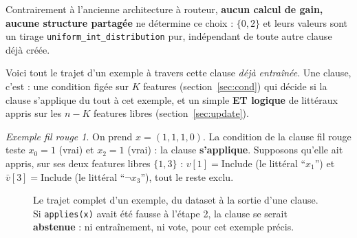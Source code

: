 \documentclass[12pt,a4paper]{article}
\newcommand{\Inc}{\ensuremath{\mathrm{Include}}}
\newcommand{\vbar}{\bar{v}}
\newcommand{\code}[1]{\texttt{#1}}
\theoremstyle{remark}
\newtheorem{exemple}{Exemple fil rouge}[section]
\begin{document}
\noindent Contrairement à l'ancienne architecture à routeur, \textbf{aucun
calcul de gain, aucune structure partagée} ne détermine ce choix : $\{0,2\}$ et
leurs valeurs sont un tirage \code{uniform\_int\_distribution} pur, indépendant
de toute autre clause déjà créée.

Voici tout le trajet d'un exemple à travers cette clause \emph{déjà
entraînée}. Une clause, c'est : une condition figée sur $K$ features
(section~\ref{sec:cond}) qui décide si la clause s'applique du tout à cet
exemple, et un simple \textbf{ET logique} de littéraux appris sur les $n-K$
features libres (section~\ref{sec:update}).

\begin{exemple}
On prend $x=(1,1,1,0)$. La condition de la clause fil rouge teste
$x_0{=}1$ (vrai) et $x_2{=}1$ (vrai) : la clause \textbf{s'applique}.
Supposons qu'elle ait appris, sur ses deux features libres $\{1,3\}$ :
$v[1]=\Inc$ (le littéral ``$x_1$'') et $\vbar[3]=\Inc$ (le littéral
``$\neg x_3$''), tout le reste exclu.
\end{exemple}

\begin{figure}[h]
\centering
{}
\caption{Le trajet complet d'un exemple, du dataset à la sortie d'une clause.
Si \code{applies(x)} avait été fausse à l'étape 2, la clause se serait
\textbf{abstenue} : ni entraînement, ni vote, pour cet exemple précis.}
\label{fig:pipeline-inference}
\end{figure}
\end{document}
